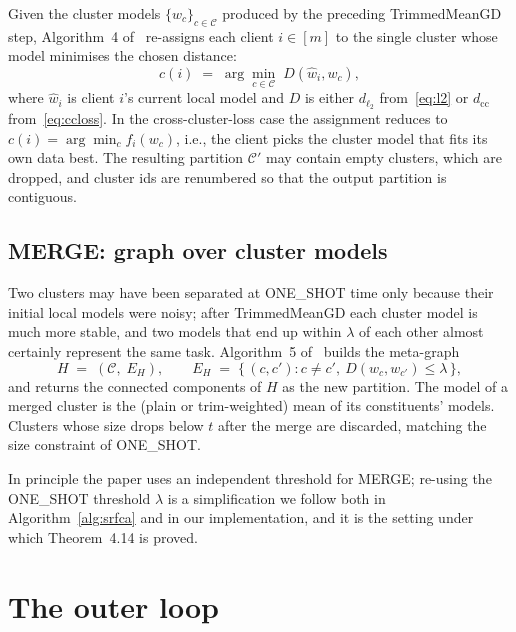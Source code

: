 Given the cluster models $\{w_c\}_{c \in \mathcal{C}}$ produced by the preceding TrimmedMeanGD step, Algorithm~4 of~\parencite{vardhan2024srfca} re-assigns each client $i \in [m]$ to the single cluster whose model minimises the chosen distance:
\begin{equation}\label{eq:recluster}
    c(i) \;=\; \arg\min_{c \in \mathcal{C}}\; D\!\left(\hat{w}_i, w_c\right),
\end{equation}
where $\hat{w}_i$ is client $i$'s current local model and $D$ is either $d_{\ell_2}$ from~\eqref{eq:l2} or $d_{\mathrm{cc}}$ from~\eqref{eq:ccloss}. In the cross-cluster-loss case the assignment reduces to $c(i) = \arg\min_c f_i(w_c)$, i.e., the client picks the cluster model that fits its own data best. The resulting partition $\mathcal{C}'$ may contain empty clusters, which are dropped, and cluster ids are renumbered so that the output partition is contiguous.

\subsection{MERGE: graph over cluster models}\label{sec:merge}

Two clusters may have been separated at ONE\_SHOT time only because their initial local models were noisy; after TrimmedMeanGD each cluster model is much more stable, and two models that end up within $\lambda$ of each other almost certainly represent the same task. Algorithm~5 of~\parencite{vardhan2024srfca} builds the meta-graph
\begin{equation}\label{eq:merge}
    H \;=\; (\mathcal{C},\; E_H),\qquad
    E_H \;=\; \bigl\{\,(c, c') : c \ne c',\ D(w_c, w_{c'}) \le \lambda\,\bigr\},
\end{equation}
and returns the connected components of $H$ as the new partition. The model of a merged cluster is the (plain or trim-weighted) mean of its constituents' models. Clusters whose size drops below $t$ after the merge are discarded, matching the size constraint of ONE\_SHOT.

In principle the paper uses an independent threshold for MERGE; re-using the ONE\_SHOT threshold $\lambda$ is a simplification we follow both in Algorithm~\ref{alg:srfca} and in our implementation, and it is the setting under which Theorem~4.14 is proved.

\section{The outer loop}\label{sec:outer-loop}

